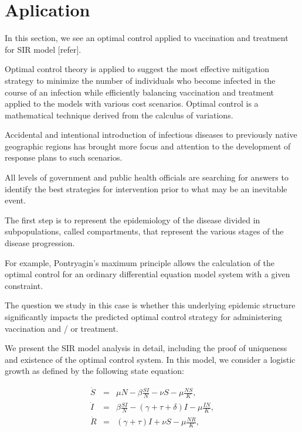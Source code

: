 \section{Aplication}

In this section, we see an optimal control applied to vaccination and treatment for SIR model [refer].

Optimal control theory is applied to suggest the most effective mitigation strategy to minimize the number of individuals who become infected in the course of an infection while efficiently balancing vaccination and treatment applied to the models with various cost scenarios. Optimal control is a mathematical technique derived from the calculus of variations.

Accidental and intentional introduction of infectious diseases to previously native geographic regions has brought more focus and attention to the development of response plans to such scenarios.

All levels of government and public health officials are searching for answers to identify the best strategies for intervention prior to what may be an inevitable event.

The first step is to represent the epidemiology of the disease divided in subpopulations, called compartments, that represent the various stages of the disease progression.

For example, Pontryagin’s maximum principle allows the calculation of the optimal control for an ordinary differential equation model system with a given constraint.

The question we study in this case is whether this underlying epidemic structure significantly impacts the predicted optimal control strategy for administering vaccination and / or treatment.

We present the SIR model analysis in detail, including the proof of uniqueness and existence of the optimal control system. In this model, we consider a logistic growth as defined by the following state equation:

\begin{eqnarray}\label{eq.1.4.SIR}
\dot{S}  &=& \mu N-\beta\frac{SI}{N}-\nu S -\mu \frac{NS}{K}, \label{eq.1.4.1}  \\
\dot{I}   &=& \beta\frac{SI}{N} - (\gamma+\tau+\delta) I -\mu \frac{IN}{K}, \label{eq.1.4.2} \\
\dot{R} &=& (\gamma+\tau) I+\nu S - \mu \frac{NR}{K},  \label{eq.1.4.3}
\end{eqnarray}


